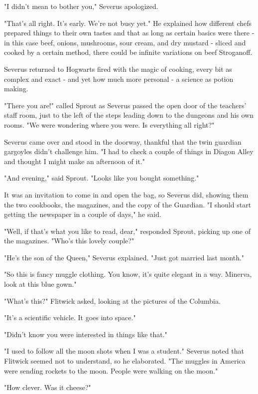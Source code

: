 \documentclass[a4paper,11pt]{article}
\begin{document}
"I didn't mean to bother you," Severus apologized.

"That's all right. It's early. We're not busy yet." He explained how different chefs prepared things to their own tastes and that as long as certain basics were there - in this case beef, onions, mushrooms, sour cream, and dry mustard - sliced and cooked by a certain method, there could be infinite variations on beef Stroganoff.

Severus returned to Hogwarts fired with the magic of cooking, every bit as complex and exact - and yet how much more personal - a science as potion making.

"There you are!" called Sprout as Severus passed the open door of the teachers' staff room, just to the left of the steps leading down to the dungeons and his own rooms. "We were wondering where you were. Is everything all right?"

Severus came over and stood in the doorway, thankful that the twin guardian gargoyles didn't challenge him. "I had to check a couple of things in Diagon Alley and thought I might make an afternoon of it."

"And evening," said Sprout. "Looks like you bought something."

It was an invitation to come in and open the bag, so Severus did, showing them the two cookbooks, the magazines, and the copy of the Guardian. "I should start getting the newspaper in a couple of days," he said.

"Well, if that's what you like to read, dear," responded Sprout, picking up one of the magazines. "Who's this lovely couple?"

"He's the son of the Queen," Severus explained. "Just got married last month."

"So this is fancy muggle clothing. You know, it's quite elegant in a way. Minerva, look at this blue gown."

"What's this?" Flitwick asked, looking at the pictures of the Columbia.

"It's a scientific vehicle. It goes into space."

"Didn't know you were interested in things like that."

"I used to follow all the moon shots when I was a student." Severus noted that Flitwick seemed not to understand, so he elaborated. "The muggles in America were sending rockets to the moon. People were walking on the moon."

"How clever. Was it cheese?"
\end{document}
